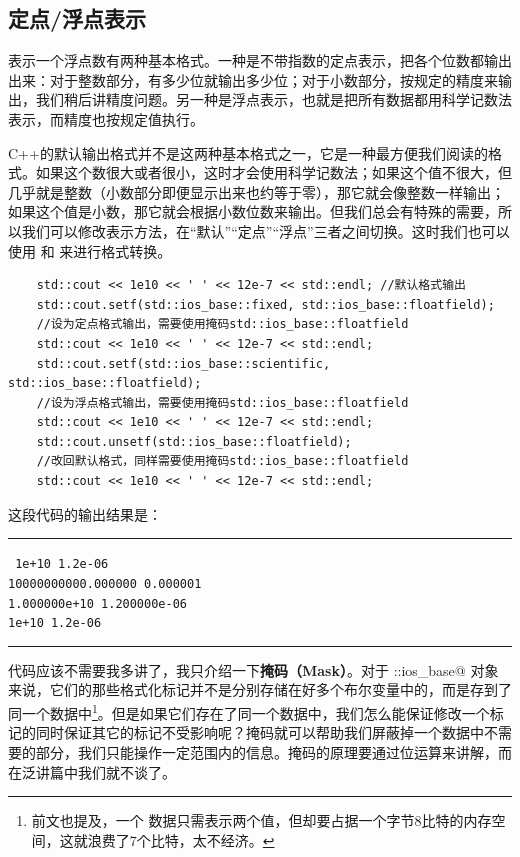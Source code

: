 \subsection*{定点/浮点表示}
表示一个浮点数有两种基本格式。一种是不带指数的定点表示，把各个位数都输出出来：对于整数部分，有多少位就输出多少位；对于小数部分，按规定的精度来输出，我们稍后讲精度问题。另一种是浮点表示，也就是把所有数据都用科学记数法表示，而精度也按规定值执行。\par
C++的默认输出格式并不是这两种基本格式之一，它是一种最方便我们阅读的格式。如果这个数很大或者很小，这时才会使用科学记数法；如果这个值不很大，但几乎就是整数（小数部分即便显示出来也约等于零），那它就会像整数一样输出；如果这个值是小数，那它就会根据小数位数来输出。但我们总会有特殊的需要，所以我们可以修改表示方法，在``默认''``定点''``浮点''三者之间切换。这时我们也可以使用 \lstinline@setf@ 和 \lstinline@unsetf@ 来进行格式转换。
\begin{lstlisting}
    std::cout << 1e10 << ' ' << 12e-7 << std::endl; //默认格式输出
    std::cout.setf(std::ios_base::fixed, std::ios_base::floatfield);
    //设为定点格式输出，需要使用掩码std::ios_base::floatfield
    std::cout << 1e10 << ' ' << 12e-7 << std::endl;
    std::cout.setf(std::ios_base::scientific, std::ios_base::floatfield);
    //设为浮点格式输出，需要使用掩码std::ios_base::floatfield
    std::cout << 1e10 << ' ' << 12e-7 << std::endl;
    std::cout.unsetf(std::ios_base::floatfield);
    //改回默认格式，同样需要使用掩码std::ios_base::floatfield
    std::cout << 1e10 << ' ' << 12e-7 << std::endl;
\end{lstlisting}
这段代码的输出结果是：\\\noindent\rule{\linewidth}{.2pt}\texttt{
1e+10 1.2e-06\\
10000000000.000000 0.000001\\
1.000000e+10 1.200000e-06\\
1e+10 1.2e-06
}\\\noindent\rule{\linewidth}{.2pt}\par
代码应该不需要我多讲了，我只介绍一下\textbf{掩码（Mask）}。对于 \lstinline@std::ios_base@ 对象来说，它们的那些格式化标记并不是分别存储在好多个布尔变量中的，而是存到了同一个数据中\footnote{前文也提及，一个 \lstinline@bool@ 数据只需表示两个值，但却要占据一个字节8比特的内存空间，这就浪费了7个比特，太不经济。}。但是如果它们存在了同一个数据中，我们怎么能保证修改一个标记的同时保证其它的标记不受影响呢？掩码就可以帮助我们屏蔽掉一个数据中不需要的部分，我们只能操作一定范围内的信息。掩码的原理要通过位运算来讲解，而在泛讲篇中我们就不谈了。\par
